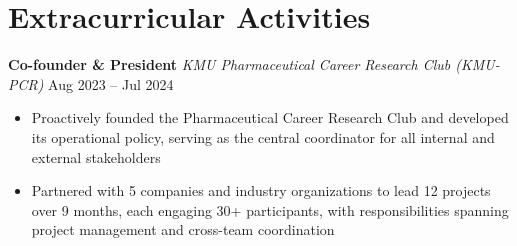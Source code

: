 \documentclass[10pt,a4paper]{article}
\newcommand{\entry}[3]{%
    \noindent\textbf{#1} \textbar{} \textit{#3} \hfill #2%
}
\begin{document}
\section{Extracurricular Activities}

\entry{Co-founder \& President}{Aug 2023 -- Jul 2024}{KMU Pharmaceutical Career Research Club (KMU-PCR)}
\begin{itemize}
    \item Proactively founded the Pharmaceutical Career Research Club and developed its operational policy, serving as the central coordinator for all internal and external stakeholders
    \item Partnered with 5 companies and industry organizations to lead 12 projects over 9 months, each engaging 30+ participants, with responsibilities spanning project management and cross-team coordination
\end{itemize}
\end{document}
